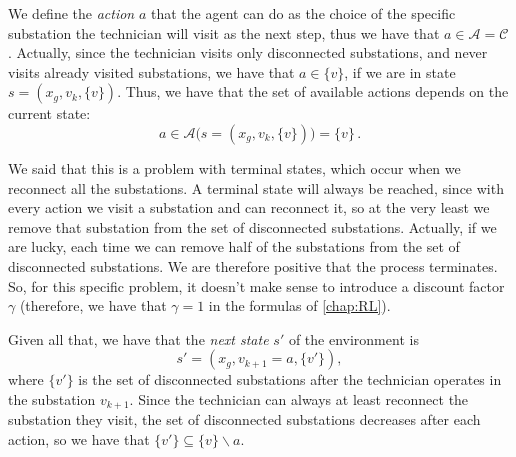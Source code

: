 We define the \emph{action} $a$ that the agent can do as the choice of the specific substation the technician will visit as the next step, thus we have that $a \in \mathcal A = \mathcal C$. Actually, since the technician visits only disconnected substations, and never visits already visited substations, we have that $a \in \{v\}$, if we are in state $s = (x_g, v_k, \{v\})$. Thus, we have that the set of available actions depends on the current state:
\begin{equation}
    a \in \mathcal A \big( s = (x_g, v_k, \{v\}) \big) = \{v\} \, .
\end{equation}

We said that this is a problem with terminal states, which occur when we reconnect all the substations. A terminal state will always be reached, since with every action we visit a substation and can reconnect it, so at the very least we remove that substation from the set of disconnected substations. Actually, if we are lucky, each time we can remove half of the substations from the set of disconnected substations. We are therefore positive that the process terminates. So, for this specific problem, it doesn't make sense to introduce a discount factor $\gamma$ (therefore, we have that $\gamma = 1$ in the formulas of \autoref{chap:RL}).

Given all that, we have that the \emph{next state} $s'$ of the environment is
\begin{equation}
    s' = (x_g, v_{k+1} = a, \{v'\}),
\end{equation}
where $\{v'\}$ is the set of disconnected substations after the technician operates in the substation $v_{k+1}$. Since the technician can always at least reconnect the substation they visit, the set of disconnected substations decreases after each action, so we have that $\{v'\} \subseteq \{v\} \backslash a$.

